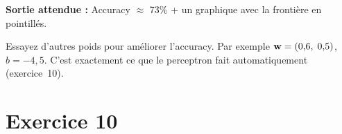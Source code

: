 \textbf{Sortie attendue :} Accuracy $\approx$ 73\% + un graphique avec la fronti\`{e}re en pointill\'{e}s.

\begin{intuitionbox}[Variante]
    Essayez d'autres poids pour am\'{e}liorer l'accuracy. Par exemple $\mathbf{w} = (0{,}6,\; 0{,}5)$, $b = -4{,}5$.
    C'est exactement ce que le perceptron fait automatiquement (exercice~10).
\end{intuitionbox}

\section*{Exercice 10 \hfill \exointermediaire}

\separateur


